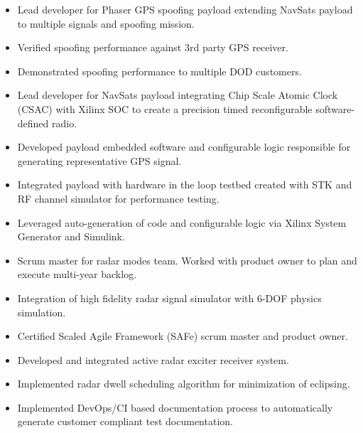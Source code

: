 \EndJob
{}
    \begin{itemize}
        \item Lead developer for Phaser GPS spoofing payload extending NavSats payload to multiple signals and spoofing mission.
        \item Verified spoofing performance against 3rd party GPS receiver.
        \item Demonstrated spoofing performance to multiple DOD customers.
    \end{itemize}
    \begin{itemize}
        \item Lead developer for NavSats payload integrating Chip Scale Atomic Clock (CSAC) with Xilinx SOC to create a precision timed reconfigurable software-defined radio.
        \item Developed payload embedded software and configurable logic responsible for generating representative GPS signal.
        \item Integrated payload with hardware in the loop testbed created with STK and RF channel simulator for performance testing.
        \item Leveraged auto-generation of code and configurable logic via Xilinx System Generator and Simulink.
    \end{itemize}
    \begin{itemize}
        \item Scrum master for radar modes team. Worked with product owner to plan and execute multi-year backlog.
        \item Integration of high fidelity radar signal simulator with 6-DOF physics simulation.
        \item Certified Scaled Agile Framework (SAFe) scrum master and product owner. 
    \end{itemize}
    \begin{itemize}
        \item Developed and integrated active radar exciter receiver system.
        \item Implemented radar dwell scheduling algorithm for minimization of eclipsing.
        \item Implemented DevOps/CI based documentation process to automatically generate customer compliant test documentation.
    \end{itemize}
